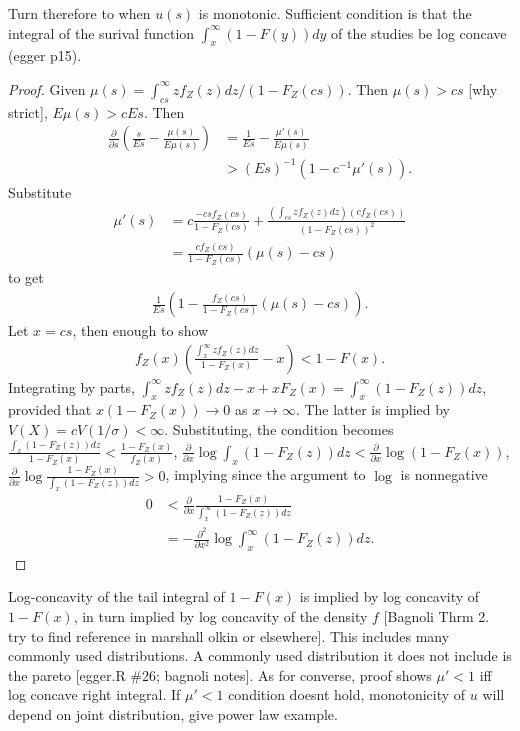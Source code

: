 \documentclass{article}
\newcommand{\partiall}[1]{\frac{\partial}{\partial #1}}
\newcommand{\E}{E}
\newcommand{\V}{V}
\begin{document}
\begin{enumerate}
  Turn therefore to when $u(s)$ is monotonic. Sufficient condition is that the
  integral of the surival function $\int_x^{\infty}(1-F(y))dy$ of the
  studies be log concave (egger p15).
  \begin{proof}
    Given $\mu(s)=\int_{cs}^\infty zf_Z(z)dz / (1-F_Z(cs))$. Then $\mu(s)>cs$ [why strict], $\E\mu(s)>c \E s$. Then
    \begin{align}
      \partiall s \left(\frac{s}{\E s} - \frac{\mu(s)}{\E \mu(s)}\right) &= \frac{1}{\E s} - \frac{\mu'(s)}{\E \mu (s)}\\
                                                                         &> (\E s)^{-1}\left( 1 - c^{-1}\mu'(s)\right).
    \end{align}
    Substitute
    \begin{align}
      \mu'(s) &= c\frac{-cs f_Z(cs)}{1-F_Z(cs)} + \frac{\left(\int_{cs}zf_Z(z)dz \right)\left(cf_Z(cs)\right)}{(1-F_Z(cs))^2}\\
      &= \frac{c f_Z(cs)}{1-F_Z(cs)}(\mu(s)-cs)
    \end{align}
    to get
    \begin{align}
      \frac{1}{\E s}\left( 1 - \frac{f_Z(cs)}{1-F_Z(cs)}(\mu(s)-cs)\right).
    \end{align}
    Let $x=cs$, then enough to show
    \begin{align}
      f_Z(x)\left(\frac{\int_x^{\infty}zf_Z(z)dz}{1-F_Z(x)}-x\right) < 1-F(x).
    \end{align}
    Integrating by parts,
    $\int_x^{\infty}zf_Z(z)dz - x +
    xF_Z(x)=\int_x^{\infty}(1-F_Z(z))dz$, provided that
    $x(1-F_Z(x))\to 0$ as $x\to\infty$. The latter is implied by
    $\V(X)=c\V(1/\sigma)<\infty$. Substituting, the condition becomes
    $\frac{\int_x(1-F_Z(z))dz}{1-F_Z(x)}<\frac{1-F_Z(x)}{f_Z(x)}$,
    $\partiall x \log \int_x(1-F_Z(z))dz < \partiall x \log
    (1-F_Z(x))$,
    $\partiall x \log \frac{1-F_Z(x)}{\int_x(1-F_Z(z))dz}>0$, implying
    since the argument to $\log$ is nonnegative
    \begin{align}
      0& < \partiall x \frac{1-F_Z(x)}{\int_x^{\infty}(1-F_Z(z))dz} \\
       & = -\frac{\partial^2}{\partial x^2}\log \int_x^{\infty}(1-F_Z(z))dz.
    \end{align}
  \end{proof}
  Log-concavity of the tail integral of $1-F(x)$ is implied by log
  concavity of $1-F(x)$, in turn implied by log concavity of the
  density $f$ [Bagnoli Thrm 2. try to find reference in marshall olkin
  or elsewhere].  This includes many commonly used distributions. A
  commonly used distribution it does not include is the pareto
  [egger.R \#26; bagnoli notes]. As for converse, proof shows $\mu'<1$
  iff log concave right integral. If $\mu'<1$ condition doesnt hold,
  monotonicity of $u$ will depend on joint distribution, give power
  law example.


\end{enumerate}
\end{document}
